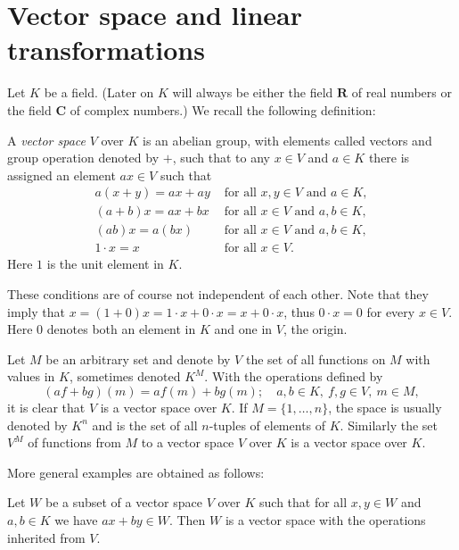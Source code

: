 \section{Vector space and linear transformations}
Let $K$ be a field. (Later on $K$ will always be either the field
$\mathbf{R}$ of real numbers or the field $\mathbf{C}$ of complex
numbers.) We recall the following definition:
\begin{dfn}\label{def:vector-space}
 A \emph{vector space} $V$ over $K$ is an abelian group, with elements called
 vectors and group operation denoted by $+$, such that to any $x\in V$
 and $a\in K$ there is assigned an element $ax\in V$ such that
 \begin{displaymath}
 \begin{array}{cl}
   a(x+y)=ax+ay& \textrm{ for all } x,y\in V \textrm{ and } a\in K,\\
   (a+b)x=ax+bx& \textrm{ for all } x\in V \textrm{ and } a,b\in K,\\
   (ab)x=a(bx)& \textrm{ for all } x\in V \textrm{ and } a,b\in K,\\
   1\cdot x=x & \textrm{ for all } x\in V.
 \end{array}
\end{displaymath}
 Here $1$ is the unit element in $K$.
\end{dfn}
These conditions are of course not independent of each other. Note
that they imply that $x=(1+0)x=1\cdot x+0\cdot x=x+0\cdot x$, thus
$0\cdot x=0$ for every $x\in V$. Here $0$ denotes both an element in
$K$ and one in $V$, the origin.
\begin{exa}
  Let $M$ be an arbitrary set and denote by $V$ the set of all
  functions on $M$ with values in $K$, sometimes denoted $K^M$. With
  the operations defined by
  \begin{displaymath}
    (af+bg)(m)=af(m)+bg(m);\quad a,b \in K,\ f,g\in V,\ m\in M,
  \end{displaymath}
  it is clear that $V$ is a vector space over $K$. If
  $M=\{1,\dots,n\}$, the space is usually denoted by $K^n$ and is the
  set of all $n$-tuples of elements of $K$. Similarly the set $V^M$ of
  functions from $M$ to a vector space $V$ over $K$ is a vector space
  over $K$.
\end{exa}
More general examples are obtained as follows:
\begin{prop}
  Let $W$ be a subset of a vector space $V$ over $K$ such that for all
  $x,y\in W$ and $a,b\in K$ we have $ax+by\in W$. Then $W$ is a vector
  space with the operations inherited from $V$.
\end{prop}
